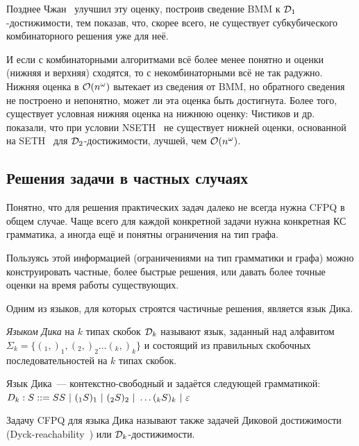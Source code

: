 Позднее Чжан~\cite{Zhang20} улучшил эту оценку, построив сведение BMM к $\mathcal{D}_1$-достижимости, тем показав, что, скорее всего, не существует субкубического комбинаторного решения уже для неё. 

И если с комбинаторными алгоритмами всё более менее понятно и оценки (нижняя и верхняя) сходятся, то с некомбинаторными всё не так радужно. Нижняя оценка в $\mathcal{O}(n^{\omega})$ вытекает из сведения от BMM, но обратного сведения не построено и непонятно, может ли эта оценка быть достигнута. Более того, существует условная нижняя оценка на нижнюю оценку: Чистиков и др.~\cite{Chistikov21} показали, что при условии NSETH~\cite{Carmosino16} не существует нижней оценки, основанной на SETH~\cite{Impagliazzo01} для $\mathcal{D}_2$-достижимости, лучшей, чем $\mathcal{O}(n^{\omega})$.

\subsection{Решения задачи в частных случаях}

Понятно, что для решения практических задач далеко не всегда нужна CFPQ в общем случае. Чаще всего для каждой конкретной задачи нужна конкретная КС грамматика, а иногда ещё и понятны ограничения на тип графа.

Пользуясь этой информацией (ограничениями на тип грамматики и графа) можно конструировать частные, более быстрые решения, или давать более точные оценки на время работы существующих. 

Одним из языков, для которых строятся частичные решения, является язык Дика.

\begin{definition}\label{def:dyck}
  \textit{Языком Дика} на $k$ типах скобок $\mathcal{D}_k$ называют язык, заданный над алфавитом $\Sigma_k = \{ (_1, )_1, (_2, )_2 \dots (_k, )_k \}$ и состоящий из правильных скобочных последовательностей на $k$ типах скобок.

  Язык Дика~--- контекстно-свободный и задаётся следующей грамматикой:\\ $D_k : S ::= S S~|~(_1 S )_1 ~|~ (_2 S )_2~|~ \dots (_k S )_k ~|~ \varepsilon$

\end{definition}

\begin{definition}\label{def:dyck_reach}
  Задачу CFPQ для языка Дика называют также задачей Диковой достижимости (Dyck-reachability~\cite{Kodumal04}) или $\mathcal{D}_k$-достижимости.
\end{definition}

